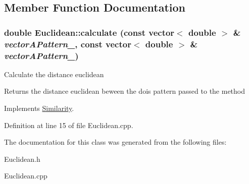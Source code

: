 \subsection{Member Function Documentation}
\hypertarget{classEuclidean_a732c1c959cc6978d4e9050bc42fda186}{
\subsubsection[{calculate}]{\setlength{\rightskip}{0pt plus 5cm}double Euclidean::calculate (const vector$<$ double $>$ \& {\em vectorAPattern\_}, \/  const vector$<$ double $>$ \& {\em vectorAPattern\_})}}
\label{classEuclidean_a732c1c959cc6978d4e9050bc42fda186}
Calculate the distance euclidean \begin{DoxyReturn}{Returns}
the distance euclidean beween the dois pattern passed to the method 
\end{DoxyReturn}


Implements \hyperlink{classSimilarity_a3ff3d3622d8a45b15531bc143308b2ae}{Similarity}.

Definition at line 15 of file Euclidean.cpp.

The documentation for this class was generated from the following files:\begin{DoxyCompactItemize}
\item 
Euclidean.h\item 
Euclidean.cpp\end{DoxyCompactItemize}
